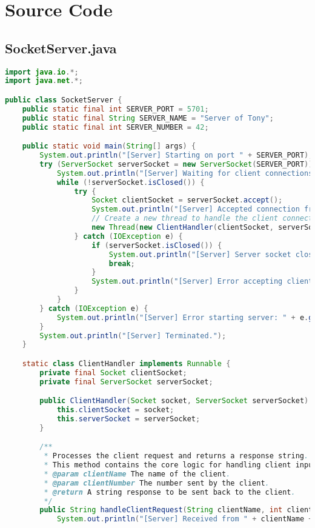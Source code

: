 \documentclass{article}
\begin{document}
\appendix
\section{Source Code}

\subsection{SocketServer.java}
\begin{lstlisting}[language=Java, caption={SocketServer.java - Multi-threaded Server}]
import java.io.*;
import java.net.*;

public class SocketServer {
    public static final int SERVER_PORT = 5701;
    public static final String SERVER_NAME = "Server of Tony";
    public static final int SERVER_NUMBER = 42;

    public static void main(String[] args) {
        System.out.println("[Server] Starting on port " + SERVER_PORT);
        try (ServerSocket serverSocket = new ServerSocket(SERVER_PORT)) {
            System.out.println("[Server] Waiting for client connections...");
            while (!serverSocket.isClosed()) {
                try {
                    Socket clientSocket = serverSocket.accept();
                    System.out.println("[Server] Accepted connection from " + clientSocket.getInetAddress());
                    // Create a new thread to handle the client connection
                    new Thread(new ClientHandler(clientSocket, serverSocket)).start();
                } catch (IOException e) {
                    if (serverSocket.isClosed()) {
                        System.out.println("[Server] Server socket closed, shutting down.");
                        break;
                    }
                    System.out.println("[Server] Error accepting client connection: " + e.getMessage());
                }
            }
        } catch (IOException e) {
            System.out.println("[Server] Error starting server: " + e.getMessage());
        }
        System.out.println("[Server] Terminated.");
    }

    static class ClientHandler implements Runnable {
        private final Socket clientSocket;
        private final ServerSocket serverSocket;

        public ClientHandler(Socket socket, ServerSocket serverSocket) {
            this.clientSocket = socket;
            this.serverSocket = serverSocket;
        }

        /**
         * Processes the client request and returns a response string.
         * This method contains the core logic for handling client input.
         * @param clientName The name of the client.
         * @param clientNumber The number sent by the client.
         * @return A string response to be sent back to the client.
         */
        public String handleClientRequest(String clientName, int clientNumber) {
            System.out.println("[Server] Received from " + clientName + ": " + clientNumber);


\end{lstlisting}
\end{document}
